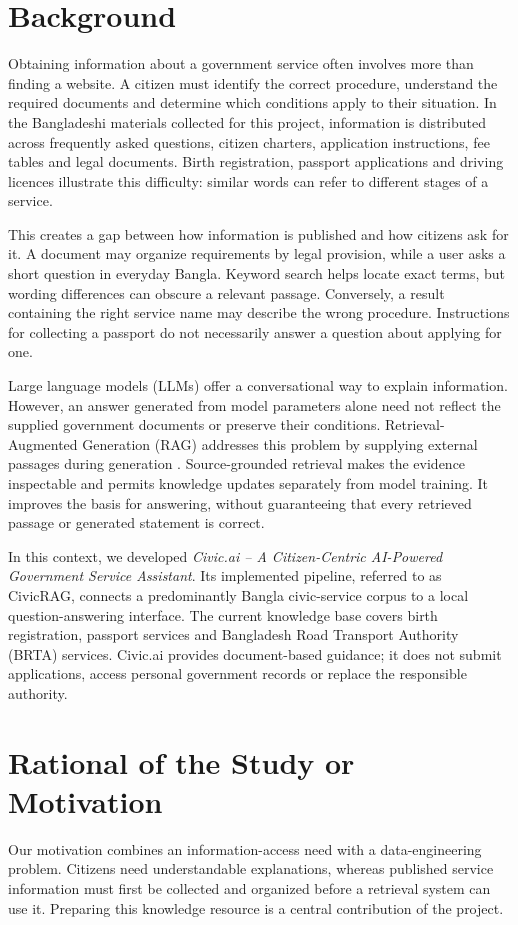 \section{Background}
Obtaining information about a government service often involves more than finding a website. A citizen must identify the correct procedure, understand the required documents and determine which conditions apply to their situation. In the Bangladeshi materials collected for this project, information is distributed across frequently asked questions, citizen charters, application instructions, fee tables and legal documents. Birth registration, passport applications and driving licences illustrate this difficulty: similar words can refer to different stages of a service.

This creates a gap between how information is published and how citizens ask for it. A document may organize requirements by legal provision, while a user asks a short question in everyday Bangla. Keyword search helps locate exact terms, but wording differences can obscure a relevant passage. Conversely, a result containing the right service name may describe the wrong procedure. Instructions for collecting a passport do not necessarily answer a question about applying for one.

Large language models (LLMs) offer a conversational way to explain information. However, an answer generated from model parameters alone need not reflect the supplied government documents or preserve their conditions. Retrieval-Augmented Generation (RAG) addresses this problem by supplying external passages during generation \cite{lewis2020rag}. Source-grounded retrieval makes the evidence inspectable and permits knowledge updates separately from model training. It improves the basis for answering, without guaranteeing that every retrieved passage or generated statement is correct.

In this context, we developed \textit{Civic.ai -- A Citizen-Centric AI-Powered Government Service Assistant}. Its implemented pipeline, referred to as CivicRAG, connects a predominantly Bangla civic-service corpus to a local question-answering interface. The current knowledge base covers birth registration, passport services and Bangladesh Road Transport Authority (BRTA) services. Civic.ai provides document-based guidance; it does not submit applications, access personal government records or replace the responsible authority.

\section{Rational of the Study or Motivation}
Our motivation combines an information-access need with a data-engineering problem. Citizens need understandable explanations, whereas published service information must first be collected and organized before a retrieval system can use it. Preparing this knowledge resource is a central contribution of the project.

